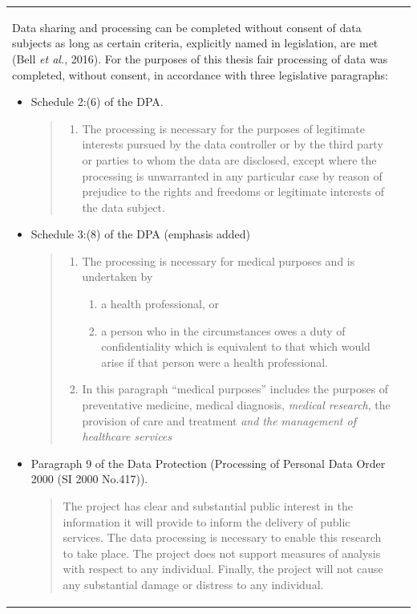 \documentclass[12pt,a4paper,oneside,table]{report}
\begin{document}
\begin{tabular}[t]{ll}
Data sharing and processing can be completed without consent of data
subjects as long as certain criteria, explicitly named in legislation,
are met (Bell \emph{et al.}, 2016). For the purposes of this thesis fair
processing of data was completed, without consent, in accordance with
three legislative paragraphs:

\begin{itemize}[noitemsep]
\item Schedule 2:(6) of the DPA.
\begin{quotation} \begin{enumerate} \item The processing is necessary for the purposes of legitimate interests pursued by the data controller or by the third party or parties to whom the data are disclosed, except where the processing is unwarranted in any particular case by reason of prejudice to the rights and freedoms or legitimate interests of the data subject.\end{enumerate} \end{quotation}

\item Schedule 3:(8) of the DPA (emphasis added)
\begin{quotation} \begin{enumerate}
\item The processing is necessary for medical purposes and is undertaken by 
\begin{enumerate}
\item a health professional, or 
\item a person who in the circumstances owes a duty of confidentiality which is equivalent to that which would arise if that person were a health professional.
\end{enumerate}
\item In this paragraph “medical purposes” includes the purposes of preventative medicine, medical diagnosis, \emph{medical research}, the provision of care and treatment \emph{and the management of healthcare services}
\end{enumerate}\end{quotation}

\item Paragraph 9 of the Data Protection (Processing of Personal Data Order 2000 (SI 2000 No.417)).
\begin{quotation} The project has clear and substantial public interest in the information it will provide to inform the delivery of public services. The data processing is necessary to enable this research to take place. The project does not support measures of analysis with respect to any individual. Finally, the project will not cause any substantial damage or distress to any individual. \end{quotation}


\end{itemize}
\end{tabular}
\end{document}
